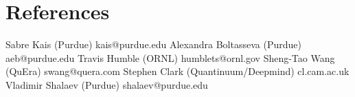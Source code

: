 \section{References}
  \resumeSubHeadingListStart
    \resumeSubheading
      {Sabre Kais (Purdue)}{}
      {kais@purdue.edu}{}
    \resumeSubheading
      {Alexandra Boltasseva (Purdue)}{}
      {aeb@purdue.edu}{}
    \resumeSubheading
      {Travis Humble (ORNL)}{}
      {humblets@ornl.gov}{}
    \resumeSubheading
      {Sheng-Tao Wang (QuEra)}{}
      {swang@quera.com}{}
    \resumeSubheading
      {Stephen Clark (Quantinuum/Deepmind)}{}
      {cl.cam.ac.uk}{}
    \resumeSubheading
      {Vladimir Shalaev (Purdue)}{}
      {shalaev@purdue.edu}{}
  \resumeSubHeadingListEnd
